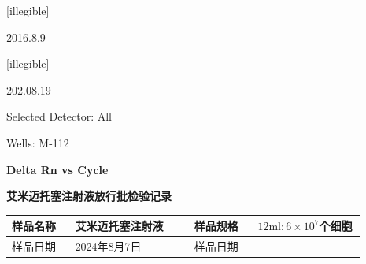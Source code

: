 \documentclass[UTF8,10pt,a4paper,fontset=fandol]{ctexart}
\newcommand{\fieldvalue}[1]{#1}
\newcommand{\handwritten}[1]{#1}
\begin{document}
\begin{center}
\handwritten{[illegible]}

\handwritten{2016.8.9}

\handwritten{[illegible]}

\handwritten{202.08.19}

\vspace{0.5em}

Selected Detector: \fieldvalue{All}

Wells: \fieldvalue{M-112}

\vspace{1em}

\textbf{Delta Rn vs Cycle}

\noindent
{}

\end{center}

\newpage

\begin{center}
\textbf{艾米迈托塞注射液放行批检验记录}
\end{center}

\begin{tabular}{|p{0.16\linewidth}|p{0.30\linewidth}|p{0.16\linewidth}|p{0.27\linewidth}|}
\hline
样品名称 & 艾米迈托塞注射液 & 样品规格 & $12\mathrm{ml}:6\times10^{7}$个细胞 \\
\hline
样品日期 &
\fieldvalue{\handwritten{2024年8月7日}} &
样品日期 & \\
\hline
\end{tabular}
\end{document}
